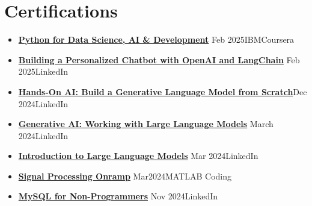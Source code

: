 \documentclass[10 pt, letterpaper]{article}
\begin{document}
\section*{Certifications}
\begin{itemize}
    \item\textbf{\href{https://coursera.org/share/3c982fd6e2daecbe9351ff039d7acda9}{Python for Data Science, AI \& Development}} \hfill {Feb 2025}\textbar IBM\textbar{}Coursera
    \vspace{-0.23cm}
    \item\textbf{\href{https://www.linkedin.com/learning/certificates/d7375d8dd9a47b3b91cd6c67d92fc23df7e8e1ca76574090603c566d80285f07?u=69719634}{
Building a Personalized Chatbot with OpenAI and LangChain}} \hfill Feb 2025\textbar LinkedIn 
       \vspace{-0.23cm}
 
    \item\textbf{\href{https://www.linkedin.com/learning/certificates/dba3eeed136b3c9d110aa04dcddc424b2acce45023f6317ceb1664018417fec0?u=69719634}{Hands-On AI: Build a Generative Language Model from Scratch}}\hfill Dec 2024\textbar LinkedIn
    \vspace{-0.25cm}
    \item \textbf{\href{https://www.linkedin.com/learning/certificates/922edd76012f6c96c8cc9895ab88d9f348b60843ac59d3f74562bcef4e064862?u=69719634}{Generative AI: Working with Large Language Models}} \hfill March 2024\textbar LinkedIn
    \vspace{-0.25cm}
    \item \textbf{\href{https://www.linkedin.com/learning/certificates/6e6de6f7cd742f6c87451ea0a2835a0e46a86eeb0449e242d459604bfc531359?u=69719634}{Introduction to Large Language Models}} \hfill Mar 2024\textbar LinkedIn
       \vspace{-0.25cm}
    \item \textbf{\href{https://matlabacademy.mathworks.com/progress/share/certificate.html?id=03cb5d04-7470-437e-84ed-50cc90b0257e&}{Signal Processing Onramp}} \hfill Mar2024\textbar MATLAB Coding
       \vspace{-0.25cm}
    \item\textbf{\href{https://www.linkedin.com/learning/certificates/d760710a391cb359911e9966bfc9926d6b82fe2d5e24348c40749d3cc696644b?u=69719634}{MySQL for Non-Programmers}} \hfill Nov 2024\textbar LinkedIn
\end{itemize}


\end{document}
